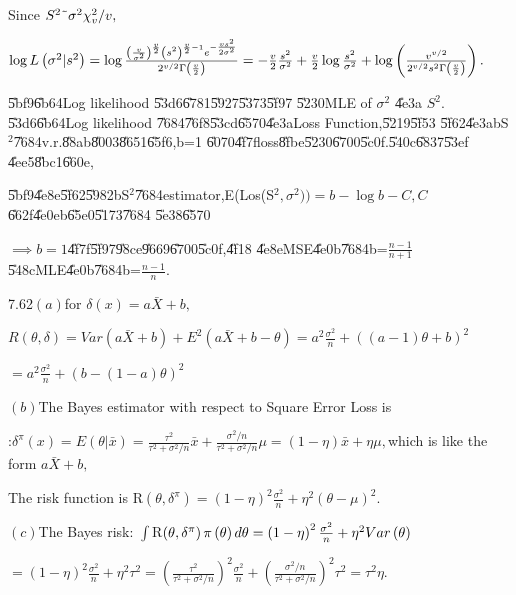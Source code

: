 \documentclass{article}
\begin{document}
Since $S^{2}\symbol{126}\sigma ^{2}\chi _{v}^{2}/v,$

$\log L\left( \sigma ^{2}|s^{2}\right) =\log \frac{\left( \frac{v}{\sigma
^{2}}\right) ^{\frac{v}{2}}\left( s^{2}\right) ^{\frac{v}{2}-1}e^{-\frac{%
vs^{2}}{2\sigma ^{2}}}}{2^{v/2}\Gamma \left( \frac{v}{2}\right) }=-\frac{v}{2%
}\frac{s^{2}}{\sigma ^{2}}+\frac{v}{2}\log \frac{s^{2}}{\sigma ^{2}}+\log
\left( \frac{v^{v/2}}{2^{v/2}s^{2}\Gamma \left( \frac{v}{2}\right) }\right)
. $

\U{5bf9}\U{6b64}Log likelihood \U{53d6}\U{6781}\U{5927}\U{5373}\U{5f97}%
\U{5230}MLE of $\sigma ^{2}$ \U{4e3a} $S^{2}.$\U{53d6}\U{6b64}Log likelihood%
\U{7684}\U{76f8}\U{53cd}\U{6570}\U{4e3a}Loss Function,\U{5219}\U{5f53}%
\U{5f62}\U{4e3a}bS$^{2}$\U{7684}v.r.\U{88ab}\U{8003}\U{8651}\U{65f6},b=1%
\U{6070}\U{4f7f}loss\U{8fbe}\U{5230}\U{6700}\U{5c0f}.\U{540c}\U{6837}\U{53ef}%
\U{4ee5}\U{8bc1}\U{660e},

\U{5bf9}\U{4e8e}\U{5f62}\U{5982}bS$^{2}$\U{7684}estimator,E(Los(S$%
^{2},\sigma ^{2}))=b-\log b-C,C$\U{662f}\U{4e0e}b\U{65e0}\U{5173}\U{7684}%
\U{5e38}\U{6570}

$\implies b=1$\U{4f7f}\U{5f97}\U{98ce}\U{9669}\U{6700}\U{5c0f},\U{4f18}%
\U{4e8e}MSE\U{4e0b}\U{7684}b=$\frac{n-1}{n+1}$\U{548c}MLE\U{4e0b}\U{7684}b=$%
\frac{n-1}{n}.$

7.62$\left( a\right) $for $\delta \left( x\right) =a\bar{X}+b,$

$R\left( \theta ,\delta \right) =Var\left( a\bar{X}+b\right) +E^{2}\left( a%
\bar{X}+b-\theta \right) =a^{2}\frac{\sigma ^{2}}{n}+\left( \left(
a-1\right) \theta +b\right) ^{2}$

$=a^{2}\frac{\sigma ^{2}}{n}+\left( b-\left( 1-a\right) \theta \right) ^{2}$

$\left( b\right) $The Bayes estimator with respect to Square Error Loss is

:$\delta ^{\pi }\left( x\right) =E\left( \theta |\bar{x}\right) =\frac{\tau
^{2}}{\tau ^{2}+\sigma ^{2}/n}\bar{x}+\frac{\sigma ^{2}/n}{\tau ^{2}+\sigma
^{2}/n}\mu =\left( 1-\eta \right) \bar{x}+\eta \mu ,$which is like the form $%
a\bar{X}+b,$

The risk function is R$\left( \theta ,\delta ^{\pi }\right) =\left( 1-\eta
\right) ^{2}\frac{\sigma ^{2}}{n}+\eta ^{2}\left( \theta -\mu \right) ^{2}.$

$\left( c\right) $The Bayes risk: $\int $R$\left( \theta ,\delta ^{\pi
}\right) \pi \left( \theta \right) d\theta =\left( 1-\eta \right) ^{2}\frac{%
\sigma ^{2}}{n}+\eta ^{2}Var\left( \theta \right) $

$=\left( 1-\eta \right) ^{2}\frac{\sigma ^{2}}{n}+\eta ^{2}\tau ^{2}=\left( 
\frac{\tau ^{2}}{\tau ^{2}+\sigma ^{2}/n}\right) ^{2}\frac{\sigma ^{2}}{n}%
+\left( \frac{\sigma ^{2}/n}{\tau ^{2}+\sigma ^{2}/n}\right) ^{2}\tau
^{2}=\tau ^{2}\eta .$
\end{document}
